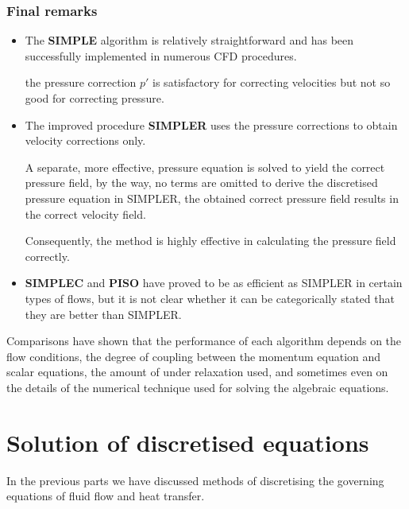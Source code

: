 \documentclass[a4paper, 15pt]{article}
\begin{document}
\section{Final remarks}


\begin{itemize}
	\item The
	\textbf{SIMPLE} algorithm is relatively straightforward and has been successfully implemented in
	numerous CFD procedures. \newline 
	
	the pressure correction $p'$ is satisfactory for correcting velocities but not so good for
	correcting pressure. 
	
	\item The improved procedure \textbf{SIMPLER} uses the pressure corrections to
	obtain velocity corrections only.  \newline 
	
	A
	separate, more effective, pressure equation is solved to yield the correct pressure field, by the way, no terms are omitted to derive the discretised pressure equation in SIMPLER, the obtained
	correct pressure field results in the correct velocity field. \newline 
	
	Consequently,
	the method is highly effective in calculating the pressure field correctly. 
	
	\item \textbf{SIMPLEC}
	and \textbf{PISO} have proved to be as efficient as SIMPLER in certain types of flows, but it is
	not clear whether it can be categorically stated that they are better than SIMPLER. 
\end{itemize}

Comparisons
have shown that the performance of each algorithm depends on the flow
conditions, the degree of coupling between the momentum equation and scalar equations, the amount of under relaxation used, and sometimes even on the details of the
numerical technique used for solving the algebraic equations. 

\newpage
\part{Solution of discretised equations}

In
the previous parts we have discussed methods of discretising the governing equations of fluid flow and heat transfer. \newline 
\end{document}

